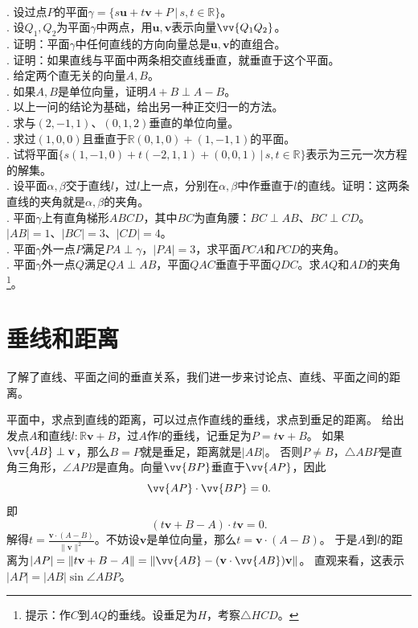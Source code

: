 \documentclass[12pt,UTF8]{ctexbook}
\begin{document}
\begin{xt}
    \mbox{} \\ 
    . 设过点$P$的平面$\gamma = \{s\mathbf{u} + t\mathbf{v} + P \, | \, s,t\in\mathbb{R}\}$。\\
    . 设$Q_1,Q_2$为平面$\gamma$中两点，用$\mathbf{u},\mathbf{v}$表示向量$\vv{Q_1Q_2}$。\\
    . 证明：平面$\gamma$中任何直线的方向向量总是$\mathbf{u},\mathbf{v}$的直组合。\\
    . 证明：如果直线与平面中两条相交直线垂直，就垂直于这个平面。\\     
    . 给定两个直无关的向量$A,B$。\\
    . 如果$A,B$是单位向量，证明$A+B \perp A-B$。\\
    . 以上一问的结论为基础，给出另一种正交归一的方法。\\
    . 求与$(2,-1,1)$、$(0,1,2)$垂直的单位向量。\\
    . 求过$(1,0,0)$且垂直于$\mathbb{R}(0,1,0)+(1,-1,1)$的平面。\\
    . 试将平面$\{s(1,-1,0) + t(-2,1,1) + (0,0,1) \, | \, s,t\in\mathbb{R}\}$表示为三元一次方程的解集。\\
    . 设平面$\alpha, \beta$交于直线$l$，过$l$上一点，分别在$\alpha, \beta$中作垂直于$l$的直线。证明：这两条直线的夹角就是$\alpha, \beta$的夹角。\\
    . 平面$\gamma$上有直角梯形$ABCD$，其中$BC$为直角腰：$BC\perp AB$、$BC\perp CD$。$|AB| = 1$、$|BC| = 3$、$|CD| = 4$。\\
    . 平面$\gamma$外一点$P$满足$PA \perp \gamma$，$|PA| = 3$，求平面$PCA$和$PCD$的夹角。\\
    . 平面$\gamma$外一点$Q$满足$QA \perp AB$，平面$QAC$垂直于平面$QDC$。求$AQ$和$AD$的夹角\footnote{提示：作$C$到$AQ$的垂线。设垂足为$H$，考察$\triangle HCD$。}。
\end{xt}


\section{垂线和距离}
了解了直线、平面之间的垂直关系，我们进一步来讨论点、直线、平面之间的距离。

平面中，求点到直线的距离，可以过点作直线的垂线，求点到垂足的距离。
给出发点$A$和直线$l : \mathbb{R}\mathbf{v} + B$，过$A$作$l$的垂线，记垂足为$P = t\mathbf{v} + B$。
如果$\vv{AB}\perp\mathbf{v}$，那么$B=P$就是垂足，距离就是$|AB|$。
否则$P\neq B$，$\triangle ABP$是直角三角形，$\angle APB$是直角。向量$\vv{BP}$垂直于$\vv{AP}$，因此
$$ \vv{AP}\cdot \vv{BP} = 0.$$
即
$$ (t\mathbf{v} + B - A)\cdot t\mathbf{v} = 0.$$
解得$t = \frac{\mathbf{v}\cdot(A-B)}{\|\mathbf{v}\|^2}$。不妨设$\mathbf{v}$是单位向量，那么$t=\mathbf{v}\cdot(A-B)$。
于是$A$到$l$的距离为$|AP| = \| t\mathbf{v} + B - A\| = \| \vv{AB} - (\mathbf{v}\cdot \vv{AB})\mathbf{v}\|$。
直观来看，这表示$|AP| = |AB|\sin{\angle ABP}$。
\end{document}

